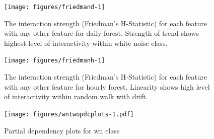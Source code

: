 \documentclass[11pt,a4paper,]{article}
\begin{document}
\begin{figure}[h]

{\centering \texttt{[image: figures/friedmand-1]} 

}

\caption{The interaction strength (Friedman's H-Statistic) for each feature with any other feature for daily forest. Strength of trend shows highest level of interactivity within white noise class.}\label{fig:friedmand}
\end{figure}

\begin{figure}[h]

{\centering \texttt{[image: figures/friedmanh-1]} 

}

\caption{The interaction strength (Friedman's H-Statistic) for each feature with any other feature for hourly forest. Linearity shows high level of interactivity within random walk with drift.}\label{fig:friedmanh}
\end{figure}

\clearpage

\begin{figure}
\centering
\texttt{[image: figures/wntwopdcplots-1.pdf]}
\caption{\label{fig:wntwopdcplots}Partial dependency plots for wn class}
\end{figure}

\printbibliography[title=References]
\end{document}
